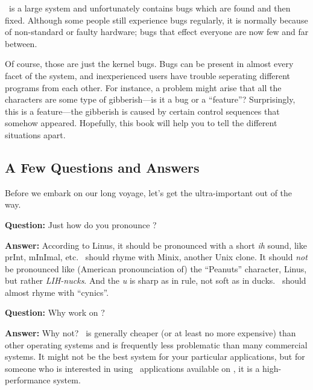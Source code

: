 \linux\ is a large system and unfortunately contains bugs which are
found and then fixed.  Although some people still experience bugs
regularly, it is normally because of non-standard or faulty hardware;
bugs that effect everyone are now few and far between.

Of course, those are just the kernel bugs.  Bugs can be present in
almost every facet of the system, and inexperienced users have trouble
seperating different programs from each other. For instance, a problem
might arise that all the characters are some type of gibberish---is it
a bug or a ``feature''?  Surprisingly, this is a feature---the
gibberish is caused by certain control sequences that somehow
appeared.  Hopefully, this book will help you to tell the different
situations apart.

\subsection{A Few Questions and Answers}


Before we embark on our long voyage, let's get the ultra-important out
of the way.

{\bf Question:} Just how do you pronounce \linux?

{\bf Answer:} According to Linus, it should be
pronounced with a short {\em ih\/} sound, like prInt, mInImal, etc.
\linux\ should rhyme with Minix, another Unix clone.  It should {\em
not\/} be pronounced like (American pronounciation of) the
``Peanuts'' character, Linus, but rather {\em
LIH-nucks}. And the {\em u} is sharp as in rule, not soft as in
ducks.  \linux\ should almost rhyme with ``cynics''.

{\bf Question:} Why work on \linux?

{\bf Answer:} Why not?  \linux\ is generally cheaper (or at least no
more expensive) than other operating systems and is frequently less
problematic than many commercial systems.  It might not be the best
system for your particular applications, but for someone who is
interested in using \unix\ applications available on \linux, it is a
high-performance system.

